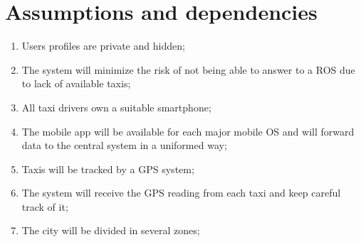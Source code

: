 \section{Assumptions and dependencies}
\begin{enumerate}

\item Users profiles are private and hidden;
\item The system will minimize the risk of not being able to answer to a ROS due to lack of available taxis;
\item All taxi drivers own a suitable smartphone;
\item The mobile app will be available for each major mobile OS and will forward data to the central system in a uniformed way;
\item Taxis will be tracked by a GPS system;
\item The system will receive the GPS reading from each taxi and keep careful track of it;
\item The city will be divided in several zones;
\end{enumerate}